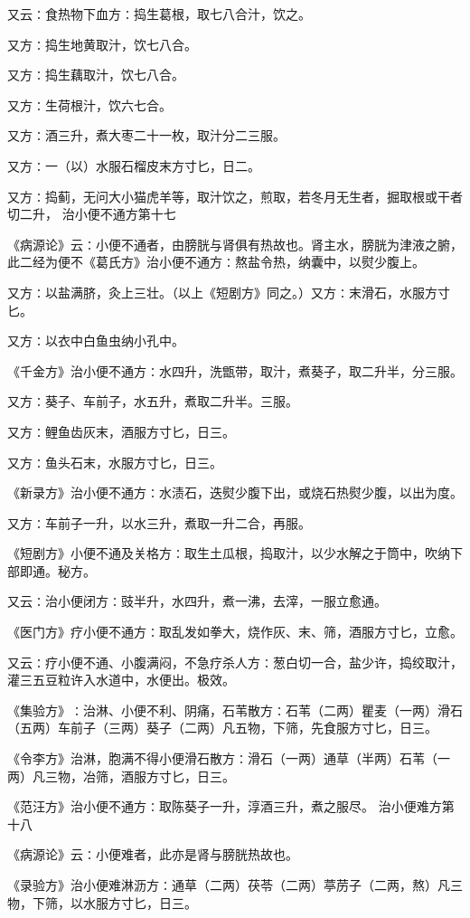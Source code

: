 \documentclass[a4paper,12pt,UTF8,twoside]{ctexbook}
\begin{document}
又云∶食热物下血方∶捣生葛根，取七八合汁，饮之。

又方∶捣生地黄取汁，饮七八合。

又方∶捣生藕取汁，饮七八合。

又方∶生荷根汁，饮六七合。

又方∶酒三升，煮大枣二十一枚，取汁分二三服。

又方∶一（以）水服石榴皮末方寸匕，日二。

又方∶捣蓟，无问大小猫虎羊等，取汁饮之，煎取，若冬月无生者，掘取根或干者切二升，
治小便不通方第十七

《病源论》云∶小便不通者，由膀胱与肾俱有热故也。肾主水，膀胱为津液之腑，此二经为便不《葛氏方》治小便不通方∶熬盐令热，纳囊中，以熨少腹上。

又方∶以盐满脐，灸上三壮。（以上《短剧方》同之。）又方∶末滑石，水服方寸匕。

又方∶以衣中白鱼虫纳小孔中。

《千金方》治小便不通方∶水四升，洗甑带，取汁，煮葵子，取二升半，分三服。

又方∶葵子、车前子，水五升，煮取二升半。三服。

又方∶鲤鱼齿灰末，酒服方寸匕，日三。

又方∶鱼头石末，水服方寸匕，日三。

《新录方》治小便不通方∶水渍石，迭熨少腹下出，或烧石热熨少腹，以出为度。

又方∶车前子一升，以水三升，煮取一升二合，再服。

《短剧方》小便不通及关格方∶取生土瓜根，捣取汁，以少水解之于筒中，吹纳下部即通。秘方。

又云∶治小便闭方∶豉半升，水四升，煮一沸，去滓，一服立愈通。

《医门方》疗小便不通方∶取乱发如拳大，烧作灰、末、筛，酒服方寸匕，立愈。

又云∶疗小便不通、小腹满闷，不急疗杀人方∶葱白切一合，盐少许，捣绞取汁，灌三五豆粒许入水道中，水便出。极效。

《集验方》∶治淋、小便不利、阴痛，石苇散方∶石苇（二两）瞿麦（一两）滑石（五两）车前子（三两）葵子（二两）凡五物，下筛，先食服方寸匕，日三。

《令李方》治淋，胞满不得小便滑石散方∶滑石（一两）通草（半两）石苇（一两）凡三物，冶筛，酒服方寸匕，日三。

《范汪方》治小便不通方∶取陈葵子一升，淳酒三升，煮之服尽。
治小便难方第十八

《病源论》云∶小便难者，此亦是肾与膀胱热故也。

《录验方》治小便难淋沥方∶通草（二两）茯苓（二两）葶苈子（二两，熬）凡三物，下筛，以水服方寸匕，日三。
\end{document}
